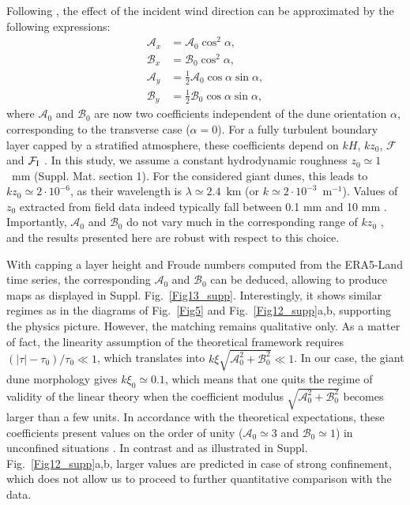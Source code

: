 Following \citet{Andreotti2012}, the effect of the incident wind direction can be approximated by the following expressions:
%
\begin{align}
  \mathcal{A}_{x} & = \mathcal{A}_{0}\cos^{2}\alpha, \\
  \mathcal{B}_{x} & = \mathcal{B}_{0}\cos^{2}\alpha, \\
  \mathcal{A}_{y} & = \displaystyle\frac{1}{2}\mathcal{A}_{0}\cos\alpha \sin\alpha, \\
  \mathcal{B}_{y} & = \displaystyle\frac{1}{2}\mathcal{B}_{0}\cos\alpha \sin\alpha,
\end{align}
%
where $\mathcal{A}_{0}$ and $\mathcal{B}_{0}$ are now two coefficients independent of the dune orientation $\alpha$, corresponding to the transverse case ($\alpha=0$). For a fully turbulent boundary layer capped by a stratified atmosphere, these coefficients depend on $k H$, $k z_{0}$, $\mathcal{F}$ and $\mathcal{F}_{\textup{I}}$ \citep{andreotti2009}. In this study, we assume a constant hydrodynamic roughness $z_{0} \simeq 1$~mm (Suppl. Mat. section 1). For the considered giant dunes, this leads to $k z_{0} \simeq 2 \cdot 10^{-6}$, as their wavelength is $\lambda \simeq 2.4$~km (or $k \simeq 2 \cdot 10^{-3}$~m$^{-1}$). Values of $z_{0}$ extracted from field data indeed typically fall between 0.1 mm and 10 mm \citep{Sherman2008, Field2018}. Importantly, $\mathcal{A}_{0}$ and $\mathcal{B}_{0}$ do not vary much in the corresponding range of $k z_{0}$ \citep{Fourriere2010}, and the results presented here are robust with respect to this choice.

With capping a layer height and Froude numbers computed from the ERA5-Land time series, the corresponding $\mathcal{A}_{0}$ and $\mathcal{B}_{0}$ can be deduced, allowing to produce maps as displayed in Suppl. Fig.~\ref{Fig13_supp}. Interestingly, it shows similar regimes as in the diagrams of Fig.~\ref{Fig5} and Fig.~\ref{Fig12_supp}a,b, supporting the physics picture. However, the matching remains qualitative only. As a matter of fact, the linearity assumption of the theoretical framework requires $\left(\vert \tau \vert - \tau_{0}\right)/\tau_{0} \ll 1$, which translates into $k\xi\sqrt{\mathcal{A}_{0}^{2} + \mathcal{B}_{0}^{2}} \ll 1$. In our case, the giant dune morphology gives $k\xi_0 \simeq 0.1$, which means that one quits the regime of validity of the linear theory when the coefficient modulus $\sqrt{\mathcal{A}_{0}^{2} + \mathcal{B}_{0}^{2}}$ becomes larger than a few units. In accordance with the theoretical expectations, these coefficients present values on the order of unity ($\mathcal{A}_{0} \simeq 3$ and $\mathcal{B}_{0} \simeq 1$) in unconfined situations \citep{Claudin2013, Lu2021}. In contrast and as illustrated in Suppl. Fig.~\ref{Fig12_supp}a,b, larger values are predicted in case of strong confinement, which does not allow us to proceed to further quantitative comparison with the data.


